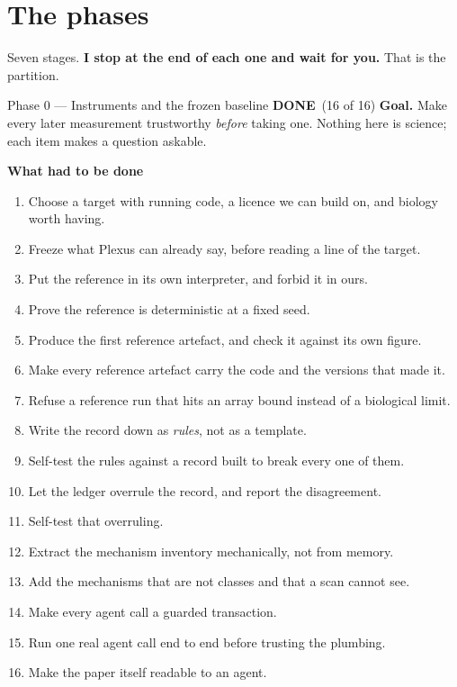 \documentclass[11pt,a4paper]{article}
\newcommand{\done}{\textcolor{good}{\textbf{DONE}}}
\begin{document}
\section{The phases}

Seven stages. \textbf{I stop at the end of each one and wait for you.} That is the partition.

\begin{phasebox}{Phase 0 --- Instruments and the frozen baseline \hfill \done\ (16 of 16)}
\textbf{Goal.} Make every later measurement trustworthy \emph{before} taking one. Nothing here is
science; each item makes a question askable.

\textbf{What had to be done}
\begin{enumerate}[leftmargin=1.5em,itemsep=1pt]
\item Choose a target with running code, a licence we can build on, and biology worth having.
\item Freeze what Plexus can already say, before reading a line of the target.
\item Put the reference in its own interpreter, and forbid it in ours.
\item Prove the reference is deterministic at a fixed seed.
\item Produce the first reference artefact, and check it against its own figure.
\item Make every reference artefact carry the code and the versions that made it.
\item Refuse a reference run that hits an array bound instead of a biological limit.
\item Write the record down as \emph{rules}, not as a template.
\item Self-test the rules against a record built to break every one of them.
\item Let the ledger overrule the record, and report the disagreement.
\item Self-test that overruling.
\item Extract the mechanism inventory mechanically, not from memory.
\item Add the mechanisms that are not classes and that a scan cannot see.
\item Make every agent call a guarded transaction.
\item Run one real agent call end to end before trusting the plumbing.
\item Make the paper itself readable to an agent.
\end{enumerate}
\end{phasebox}
\end{document}

